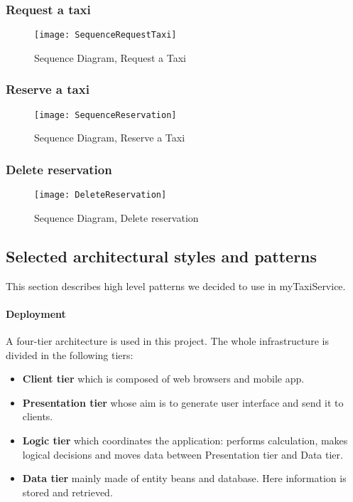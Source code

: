 \subsubsection{Request a taxi} %
\begin{figure}[H]
    \centering
    \texttt{[image: SequenceRequestTaxi]}
    \caption{Sequence Diagram, Request a Taxi}
    \label{fig:request}
\end{figure}

\subsubsection{Reserve a taxi} %
\begin{figure}[H]
    \centering
    \texttt{[image: SequenceReservation]}
    \caption{Sequence Diagram, Reserve a Taxi}
    \label{fig:Reserve}
\end{figure}

\subsubsection{Delete reservation} %
\begin{figure}[H]
    \centering
    \texttt{[image: DeleteReservation]}
    \caption{Sequence Diagram, Delete reservation}
    \label{fig:delete}
\end{figure}

\pagebreak
\subsection{Selected architectural styles and patterns}
This section describes high level patterns we decided to use in myTaxiService.

\paragraph{Deployment} A four-tier architecture is used in this project.
The whole infrastructure is divided in the following tiers:

\begin{itemize}
    \item{\textbf{Client tier} which is composed of web browsers and mobile app.}
    \item{\textbf{Presentation tier} whose aim is to generate user interface and send it to clients.}
    \item{\textbf{Logic tier} which coordinates the application: performs calculation, makes logical decisions and moves data between Presentation tier and Data tier.}
    \item{\textbf{Data tier} mainly made of entity beans and database. 
    Here information is stored and retrieved.}
\end{itemize}


